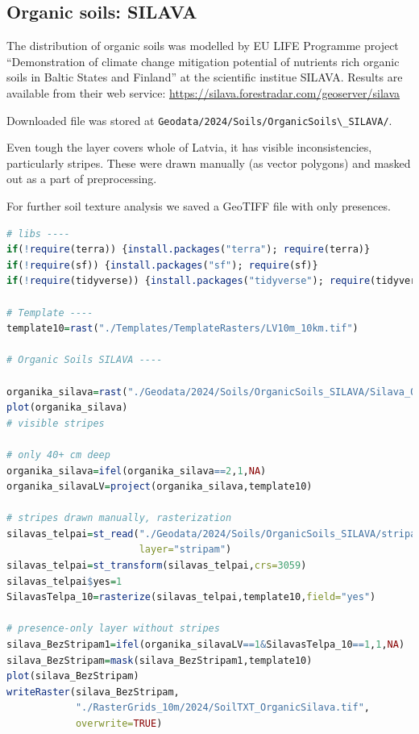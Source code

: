\documentclass[
]{book}
\newcommand{\passthrough}[1]{#1}
\begin{document}
\subsection{Organic soils: SILAVA}\label{Ch04.07.05}

The distribution of organic soils was modelled by EU LIFE Programme project
``Demonstration of climate change mitigation potential of nutrients rich organic
soils in Baltic States and Finland'' at the scientific institue SILAVA. Results are
available from their web service: \url{https://silava.forestradar.com/geoserver/silava}

Downloaded file was stored at \passthrough{\lstinline!Geodata/2024/Soils/OrganicSoils\_SILAVA/!}.

Even tough the layer covers whole of Latvia, it has visible inconsistencies,
particularly stripes. These were drawn manually (as vector polygons) and masked
out as a part of preprocessing.

For further soil texture analysis we saved a GeoTIFF file with only presences.

\begin{lstlisting}[language=R]
# libs ----
if(!require(terra)) {install.packages("terra"); require(terra)}
if(!require(sf)) {install.packages("sf"); require(sf)}
if(!require(tidyverse)) {install.packages("tidyverse"); require(tidyverse)}

# Template ----
template10=rast("./Templates/TemplateRasters/LV10m_10km.tif")

# Organic Soils SILAVA ----

organika_silava=rast("./Geodata/2024/Soils/OrganicSoils_SILAVA/Silava_OrgSoils.tif")
plot(organika_silava)
# visible stripes

# only 40+ cm deep
organika_silava=ifel(organika_silava==2,1,NA)
organika_silavaLV=project(organika_silava,template10)

# stripes drawn manually, rasterization
silavas_telpai=st_read("./Geodata/2024/Soils/OrganicSoils_SILAVA/stripam.gpkg",
                       layer="stripam")
silavas_telpai=st_transform(silavas_telpai,crs=3059)
silavas_telpai$yes=1
SilavasTelpa_10=rasterize(silavas_telpai,template10,field="yes")

# presence-only layer without stripes
silava_BezStripam1=ifel(organika_silavaLV==1&SilavasTelpa_10==1,1,NA)
silava_BezStripam=mask(silava_BezStripam1,template10)
plot(silava_BezStripam)
writeRaster(silava_BezStripam,
            "./RasterGrids_10m/2024/SoilTXT_OrganicSilava.tif",
            overwrite=TRUE)
\end{lstlisting}
\end{document}
